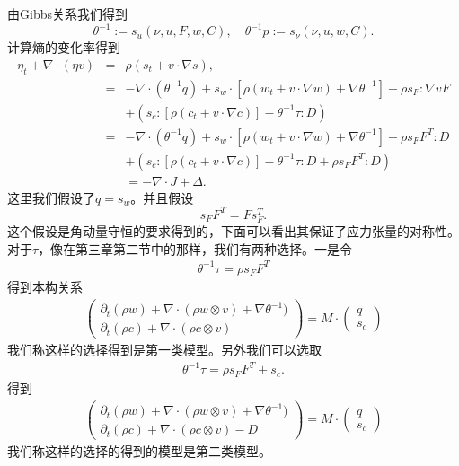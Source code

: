 \documentclass{article}
\begin{document}
由Gibbs关系我们得到
$$\theta^{-1}:=s_{u} (\nu,u,F, w,C), \quad \theta^{-1} p := s_\nu (\nu,u,w,C).$$
计算熵的变化率得到
\begin{eqnarray*}
		\eta_t + \nabla \cdot (\eta v) &=& \rho (s_t + v \cdot \nabla s), \\
		&=& -\nabla \cdot (\theta^{-1} q) + s_w \cdot [\rho (w_t + v \cdot \nabla w) + \nabla \theta^{-1}] + \rho s_F : \nabla v F  \\
		&& + (s_c:[\rho (c_t + v \cdot \nabla c)] - \theta^{-1} \tau : D) \\
		&=& -\nabla \cdot (\theta^{-1} q) + s_w \cdot [\rho (w_t + v \cdot \nabla w)+\nabla \theta^{-1}] + \rho s_F F^T : D  \\
		&& + (s_c:[\rho (c_t + v \cdot \nabla c)] - \theta^{-1} \tau : D + \rho s_F F^T : D)  \\
		&& = -\nabla \cdot J + \Delta.
\end{eqnarray*}
这里我们假设了$q=s_w$。并且假设
\begin{equation}
	s_F F^T = F s_F^T.	
\end{equation}
这个假设是角动量守恒的要求得到的\cite{dimitrienko2010nonlinear,dafermos2010hyperbolic}，下面可以看出其保证了应力张量的对称性。
对于$\tau$，像在第三章第二节中的那样，我们有两种选择。一是令
\begin{eqnarray*}
\theta^{-1} \tau = \rho s_F F^T 
\end{eqnarray*}
得到本构关系
\begin{eqnarray}\label{eq:finite1}
\left( \begin{array}{c} \partial_t (\rho w) + \nabla \cdot (\rho w \otimes v) + \nabla \theta^{-1}) \\
	\partial_t (\rho c) + \nabla \cdot (\rho c \otimes v) \end{array} \right)
=
M \cdot \left( \begin{array}{c} q \\ s_c \end{array} \right)
\end{eqnarray}
我们称这样的选择得到是第一类模型。另外我们可以选取
\begin{eqnarray*}
	\theta^{-1} \tau = \rho s_F F^T + s_c.
\end{eqnarray*}
得到
\begin{eqnarray}\label{eq:finite2}
\left( \begin{array}{c} \partial_t (\rho w) + \nabla \cdot (\rho w \otimes v) + \nabla \theta^{-1}) \\
	\partial_t (\rho c) + \nabla \cdot (\rho c \otimes v) - D \end{array} \right)
=
M \cdot \left( \begin{array}{c} q \\ s_c  \end{array} \right)
\end{eqnarray}
我们称这样的选择的得到的模型是第二类模型。
\end{document}
